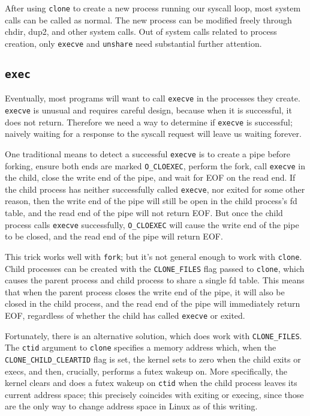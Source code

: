 \documentclass{acmart}
\begin{document}
After using \texttt{clone} to create a new process running our syscall loop,
most system calls can be called as normal.
The new process can be modified freely through chdir, dup2, and other system calls.
Out of system calls related to process creation,
only \texttt{execve} and \texttt{unshare} need substantial further attention.
\subsection{\texttt{exec}}
Eventually, most programs will want to call \texttt{execve} in the processes they create.
\texttt{execve} is unusual and requires careful design,
because when it is successful, it does not return.
Therefore we need a way to determine if \texttt{execve} is successful;
naively waiting for a response to the syscall request will leave us waiting forever.

One traditional means to detect a successful \texttt{execve} is to create a pipe before forking,
ensure both ends are marked \verb|O_CLOEXEC|,
perform the fork,
call \texttt{execve} in the child,
close the write end of the pipe,
and wait for EOF on the read end.
If the child process has neither successfully called \texttt{execve}, nor exited for some other reason,
then the write end of the pipe will still be open in the child process's fd table,
and the read end of the pipe will not return EOF.
But once the child process calls \texttt{execve} successfully,
\verb|O_CLOEXEC| will cause the write end of the pipe to be closed,
and the read end of the pipe will return EOF.

This trick works well with \texttt{fork};
but it's not general enough to work with \texttt{clone}.
Child processes can be created with the \verb|CLONE_FILES| flag passed to \texttt{clone},
which causes the parent process and child process to share a single fd table.
This means that when the parent process closes the write end of the pipe,
it will also be closed in the child process,
and the read end of the pipe will immediately return EOF,
regardless of whether the child has called \texttt{execve} or exited.

Fortunately, there is an alternative solution, which does work with \verb|CLONE_FILES|.
The \texttt{ctid} argument to \texttt{clone} specifies a memory address which,
when the \verb|CLONE_CHILD_CLEARTID| flag is set,
the kernel sets to zero when the child exits or execs,
and then, crucially, performs a futex wakeup on.
More specifically,
the kernel clears and does a futex wakeup on \texttt{ctid} when the child process leaves its current address space;
this precisely coincides with exiting or execing,
since those are the only way to change address space in Linux as of this writing.
\end{document}
